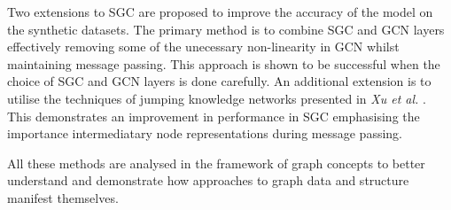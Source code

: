 Two extensions to SGC are proposed to improve the accuracy of the model on the synthetic datasets.
The primary method is to combine SGC and GCN layers effectively removing some of the unecessary non-linearity in GCN whilst maintaining message passing.
This approach is shown to be successful when the choice of SGC and GCN layers is done carefully.
An additional extension is to utilise the techniques of jumping knowledge networks presented in \textit{Xu et al.} \cite{xu2018representation}.
This demonstrates an improvement in performance in SGC emphasising the importance intermediatary node representations during message passing.

All these methods are analysed in the framework of graph concepts to better understand and demonstrate how approaches to graph data and structure manifest themselves.












